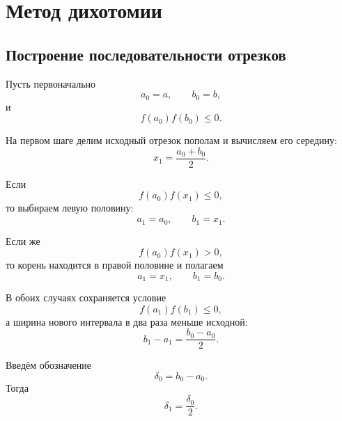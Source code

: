 \documentclass[../final.tex]{subfiles}
\begin{document}
\section{Метод дихотомии}

\subsection{Построение последовательности отрезков}

Пусть первоначально
%
\begin{equation*}
    a_0=a,
    \qquad
    b_0=b,
\end{equation*}
%
и
%
\begin{equation*}
    f(a_0)f(b_0)\leq0.
\end{equation*}

На первом шаге делим исходный отрезок пополам и вычисляем его
середину:
%
\begin{equation*}
    x_1=\frac{a_0+b_0}{2}.
\end{equation*}

Если
%
\begin{equation*}
    f(a_0)f(x_1)\leq0,
\end{equation*}
%
то выбираем левую половину:
%
\begin{equation*}
    a_1=a_0,
    \qquad
    b_1=x_1.
\end{equation*}

Если же
%
\begin{equation*}
    f(a_0)f(x_1)>0,
\end{equation*}
%
то корень находится в правой половине и полагаем
%
\begin{equation*}
    a_1=x_1,
    \qquad
    b_1=b_0.
\end{equation*}

В обоих случаях сохраняется условие
%
\begin{equation*}
    f(a_1)f(b_1)\leq0,
\end{equation*}
%
а ширина нового интервала в два раза меньше исходной:
%
\begin{equation*}
    b_1-a_1
    =
    \frac{b_0-a_0}{2}.
\end{equation*}

Введём обозначение
%
\begin{equation*}
    \delta_0=b_0-a_0.
\end{equation*}
%
Тогда
%
\begin{equation*}
    \delta_1=\frac{\delta_0}{2}.
\end{equation*}
\end{document}
